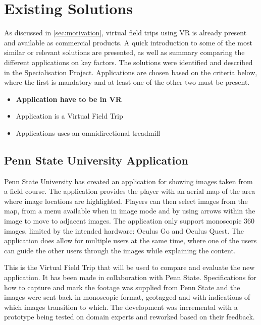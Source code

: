\section{Existing Solutions}
    
    
    As discussed in \cref{sec:motivation}, virtual field trips using VR is already present and available as commercial products. A quick introduction to some of the most similar or relevant solutions are presented, as well as summary comparing the different applications on key factors. The solutions were identified and described in the Specialisation Project\cite{specialisation}. Applications are chosen based on the criteria below, where the first is mandatory and at least one of the other two must be present.
    
    \begin{itemize}
        \item \textbf{Application have to be in VR}
        
        \item Application is a Virtual Field Trip
        
        \item Applications uses an omnidirectional treadmill
    \end{itemize}
    
    \subsection{Penn State University Application}
        Penn State University has created an application for showing images taken from a field course. The application provides the player with an aerial map of the area where image locations are highlighted. Players can then select images from the map, from a menu available when in image mode and by using arrows within the image to move to adjacent images. The application only support monoscopic 360 images, limited by the intended hardware: Oculus Go and Oculus Quest. The application does allow for multiple users at the same time, where one of the users can guide the other users through the images while explaining the content.
        
        This is the Virtual Field Trip that will be used to compare and evaluate the new application. It has been made in collaboration with Penn State. Specifications for how to capture and mark the footage was supplied from Penn State and the images were sent back in monoscopic format, geotagged and with indications of which images transition to which. The development was incremental with a prototype being tested on domain experts and reworked based on their feedback.
    
